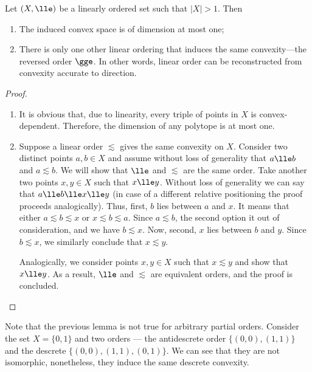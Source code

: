 \documentclass[12pt, a4paper]{article}
\newcommand{\varlle}{\lesssim}
\begin{document}
\begin{lemma}\label{order-unique}
    Let \((X, \lle)\) be a linearly ordered set such that \(|X| > 1\). Then

    \begin{enumerate}
        \item The induced convex space is of dimension at most one;
        \item There is only one other linear ordering that induces the same convexity---the reversed order \(\gge\). In other words, linear order can be reconstructed from convexity accurate to direction.
    \end{enumerate}
\end{lemma}
\begin{proof}~
    \begin{enumerate}
        \item It is obvious that, due to linearity, every triple of points in \(X\) is convex-dependent. Therefore, the dimension of any polytope is at most one.
        
        \item Suppose a linear order \(\varlle\) gives the same convexity on \(X\). Consider two distinct points \(a, b \in X\) and assume without loss of generality that \(a \lle b\) and \(a \varlle b\). We will show that \(\lle\) and \(\varlle\) are the same order. Take another two points \(x, y \in X\) such that \(x \lle y\). Without loss of generality we can say that \(a \lle b \lle x \lle y\) (in case of a different relative positioning the proof proceeds analogically). Thus, first, \(b\) lies between \(a\) and \(x\). It means that either \(a \varlle b \varlle x\) or \(x \varlle b \varlle a\). Since \(a \varlle b\), the second option it out of consideration, and we have \(b \varlle x\). Now, second, \(x\) lies between \(b\) and \(y\). Since \(b \varlle x\), we similarly conclude that \(x \varlle y\).
        
        Analogically, we consider points \(x, y \in X\) such that \(x \varlle y\) and show that \(x \lle y\). As a result, \(\lle\) and \(\varlle\) are equivalent orders, and the proof is concluded.
    \end{enumerate}
\end{proof}

\begin{remark}
    Note that the previous lemma is not true for arbitrary partial orders. Consider the set \(X = \{0, 1\}\) and two orders --- the antidescrete order \(\{(0,0), (1,1)\}\) and the descrete \(\{(0,0), (1,1), (0,1)\}\). We can see that they are not isomorphic, nonetheless, they induce the same descrete convexity.
\end{remark}
\end{document}
